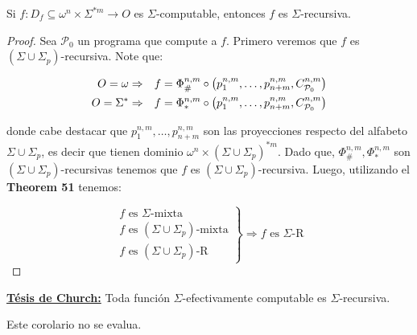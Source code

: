   \begin{corollary}
    \PN Si $f: D_{f} \subseteq \omega^{n} \times \Sigma^{\ast m} \rightarrow O$ es $\Sigma$-computable, entonces $f$ es
    $\Sigma$-recursiva.
  \end{corollary}
  \begin{proof}
    \PN Sea $\mathcal{P}_{0}$ un programa que compute a $f$. Primero veremos que $f$ es $(\Sigma \cup
    \Sigma_{p})$-recursiva. Note que:

    \begin{eqnarray*}
      O = \omega &\Rightarrow& f = \Phi_{\#}^{n,m} \circ \left(p_{1}^{n,m},\dotsc,p_{n+m}^{n,m},
        C_{\mathcal{P}_{0}}^{n,m}\right) \\
      O = \Sigma^{\ast} &\Rightarrow& f = \Phi_{\ast}^{n,m} \circ \left(p_{1}^{n,m},\dotsc,p_{n+m}^{n,m},
        C_{\mathcal{P}_{0}}^{n,m}\right)
    \end{eqnarray*}

    \PN donde cabe destacar que $p_{1}^{n,m},\dotsc,p_{n+m}^{n,m}$ son las proyecciones respecto del alfabeto $\Sigma
    \cup \Sigma_{p}$, es decir que tienen dominio $\omega^{n} \times (\Sigma \cup \Sigma_{p})^{\ast m}$. Dado que,
    $\Phi_{\#}^{n,m}, \Phi_{\ast}^{n,m}$ son $(\Sigma \cup \Sigma_{p})$-recursivas tenemos que $f$ es $(\Sigma \cup
    \Sigma_{p})$-recursiva. Luego, utilizando el \textbf{Theorem 51} tenemos:

    \begin{equation*}
		  	\left.
		  	\begin{array}{l}
          f \text{ es } \Sigma\text{-mixta} \\
          f \text{ es } (\Sigma \cup \Sigma_{p})\text{-mixta} \\
          f \text{ es } (\Sigma \cup \Sigma_{p})\text{-R}
		  	\end{array}
		  	\right\rbrace
        \Rightarrow f \text{ es } \Sigma\text{-R}
		\end{equation*}
  \end{proof}

  \PN \textbf{\underline{Tésis de Church:}} Toda función $\Sigma$-efectivamente computable es $\Sigma$-recursiva.

  \begin{corollary}
    \PN Este corolario no se evalua.
  \end{corollary}


